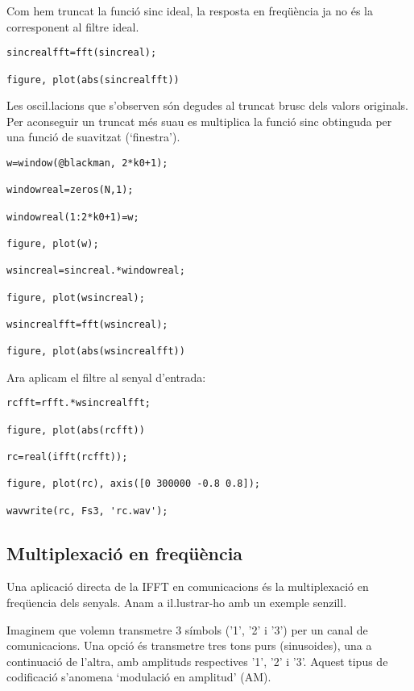 \documentclass{article}
\begin{document}
Com hem truncat la funció sinc ideal, la resposta en freqüència ja no és la corresponent al filtre ideal.

\begin{verbatim}
sincrealfft=fft(sincreal);

figure, plot(abs(sincrealfft))
\end{verbatim}

Les oscil.lacions que s'observen són degudes al truncat brusc dels valors originals.
Per aconseguir un truncat més suau es multiplica la funció sinc obtinguda per una funció de
suavitzat (`finestra').

\begin{verbatim}
w=window(@blackman, 2*k0+1);

windowreal=zeros(N,1);

windowreal(1:2*k0+1)=w;

figure, plot(w);

wsincreal=sincreal.*windowreal;

figure, plot(wsincreal);

wsincrealfft=fft(wsincreal);

figure, plot(abs(wsincrealfft))
\end{verbatim}

Ara aplicam el filtre al senyal d'entrada:

\begin{verbatim}
rcfft=rfft.*wsincrealfft;

figure, plot(abs(rcfft))

rc=real(ifft(rcfft));

figure, plot(rc), axis([0 300000 -0.8 0.8]);

wavwrite(rc, Fs3, 'rc.wav');
\end{verbatim}


\subsection{Multiplexació en freqüència}

Una aplicació directa de la IFFT en comunicacions és la multiplexació en freqüencia dels senyals.
Anam a il.lustrar-ho amb un exemple senzill.

Imaginem que volemn transmetre 3 símbols ('1', '2' i '3') per un canal de comunicacions.
Una opció és transmetre tres tons purs (sinusoides), una a continuació de l'altra,
 amb amplituds respectives '1', '2' i '3'. Aquest tipus de codificació s'anomena `modulació en amplitud' (AM).
\end{document}
